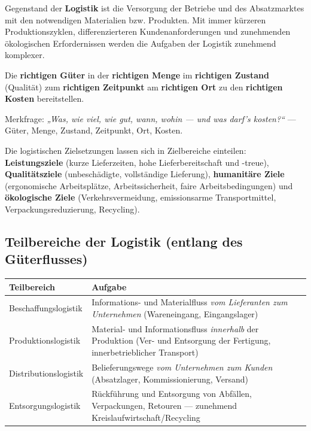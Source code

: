 \documentclass[11pt, a4paper]{article}
\begin{document}
Gegenstand der \textbf{Logistik} ist die Versorgung der Betriebe und des Absatzmarktes
mit den notwendigen Materialien bzw. Produkten. Mit immer kürzeren Produktionszyklen,
differenzierteren Kundenanforderungen und zunehmenden ökologischen Erfordernissen werden
die Aufgaben der Logistik zunehmend komplexer.

\begin{merksatz}[title={\bfseries Die 6 R der Logistik}]
Die \textbf{richtigen Güter} in der \textbf{richtigen Menge} im \textbf{richtigen
Zustand} (Qualität) zum \textbf{richtigen Zeitpunkt} am \textbf{richtigen Ort} zu den
\textbf{richtigen Kosten} bereitstellen.
\end{merksatz}

\begin{eselsbruecke}
Merkfrage: \emph{„Was, wie viel, wie gut, wann, wohin --- und was darf's kosten?``}
--- Güter, Menge, Zustand, Zeitpunkt, Ort, Kosten.
\end{eselsbruecke}

Die logistischen Zielsetzungen lassen sich in Zielbereiche einteilen:
\textbf{Leistungsziele} (kurze Lieferzeiten, hohe Lieferbereitschaft und -treue),
\textbf{Qualitätsziele} (unbeschädigte, vollständige Lieferung), \textbf{humanitäre
Ziele} (ergonomische Arbeitsplätze, Arbeitssicherheit, faire Arbeitsbedingungen) und
\textbf{ökologische Ziele} (Verkehrsvermeidung, emissionsarme Transportmittel,
Verpackungsreduzierung, Recycling).

\subsection{Teilbereiche der Logistik (entlang des Güterflusses)}

\begin{center}
\begin{tabular}{p{4.2cm} p{10cm}}
\textbf{Teilbereich} & \textbf{Aufgabe}\\
\hline
Beschaffungslogistik & Informations- und Materialfluss \emph{vom Lieferanten zum Unternehmen} (Wareneingang, Eingangslager)\\
Produktionslogistik & Material- und Informationsfluss \emph{innerhalb} der Produktion (Ver- und Entsorgung der Fertigung, innerbetrieblicher Transport)\\
Distributionslogistik & Belieferungswege \emph{vom Unternehmen zum Kunden} (Absatzlager, Kommissionierung, Versand)\\
Entsorgungslogistik & Rückführung und Entsorgung von Abfällen, Verpackungen, Retouren --- zunehmend Kreislaufwirtschaft/Recycling\\
\end{tabular}
\end{center}
\end{document}
